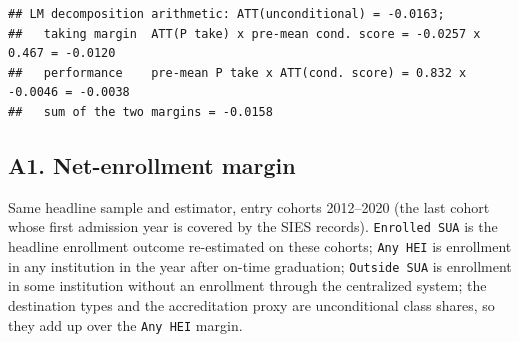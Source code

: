 \documentclass[
]{article}
\begin{document}
\begin{table}[htbp]
   \caption{Decomposition of the LM Effect: Taking vs. Performance}\label{tab: lm decomposition}
   \centerline{}
\end{table}

\begin{verbatim}
## LM decomposition arithmetic: ATT(unconditional) = -0.0163;
##   taking margin  ATT(P take) x pre-mean cond. score = -0.0257 x 0.467 = -0.0120
##   performance    pre-mean P take x ATT(cond. score) = 0.832 x -0.0046 = -0.0038
##   sum of the two margins = -0.0158
\end{verbatim}

\hypertarget{a1.-net-enrollment-margin}{%
\subsection{A1. Net-enrollment margin}\label{a1.-net-enrollment-margin}}

Same headline sample and estimator, entry cohorts 2012--2020 (the last
cohort whose first admission year is covered by the SIES records).
\texttt{Enrolled\ SUA} is the headline enrollment outcome re-estimated
on these cohorts; \texttt{Any\ HEI} is enrollment in any institution in
the year after on-time graduation; \texttt{Outside\ SUA} is enrollment
in some institution without an enrollment through the centralized
system; the destination types and the accreditation proxy are
unconditional class shares, so they add up over the \texttt{Any\ HEI}
margin.
\end{document}
